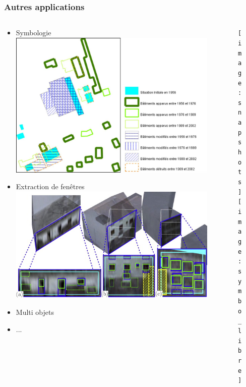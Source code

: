 \documentclass{beamer}
\begin{document}
\begin{frame}
\frametitle{Autres applications}
\begin{columns}
\begin{column}{0.5\textwidth}
\begin{itemize}
\item Symbologie \hfill \includegraphics[width = 0.5\linewidth]{symbology}
\item Extraction de fenêtres \hfill \includegraphics[width = 0.5\linewidth]{jpb}
\item Multi objets
\item ...
\end{itemize}
\end{column}
\begin{column}{0.5\textwidth}
\begin{figure}
\texttt{[image: snapshots]}\\
\texttt{[image: symbo\_libre]}
\end{figure}
\end{column}
\end{columns}
\end{frame}
\end{document}
